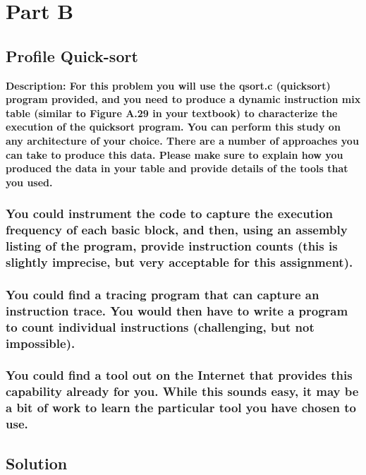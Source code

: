 \newpage



\section{Part B}

\subsection{Profile Quick-sort}
\textbf{Description: For	this	problem	you	will	use	the	qsort.c	(quicksort)	program	provided,	and	you	
need	to	produce	a	dynamic	instruction	mix	table	(similar	to	Figure	A.29 in	your	
textbook)	to characterize	the	execution	of	the	quicksort	program. You	can	perform	
this	study	on	any	architecture	of	your	choice.	There	are	a	number	of approaches	you	
can	take	to	produce	this	data. Please	make	sure	to	explain	how	you	produced	the	data	in	your	table	and	provide
details	of	the	tools	that	you	used.}
\subsubsection{You	could	instrument	the	code	to	capture	the	execution	frequency	of	each
basic	block,	and	then,	using	an	assembly	listing	of	the	program,	provide
instruction	counts	(this	is	slightly	imprecise,	but	very	acceptable	for	this
assignment).}
\subsubsection{You	could	find	a	tracing	program	that	can	capture	an	instruction	trace.	You
would	then	have	to	write	a	program	to	count	individual	instructions
(challenging,	but	not	impossible).}
\subsubsection{You	could	find	a	tool	out	on	the	Internet	that	provides	this	capability	already
for	you.	While	this	sounds	easy,	it	may	be	a	bit	of	work	to	learn	the	particular
tool	you	have	chosen	to	use.}

\breakrule

\subsection{Solution}

